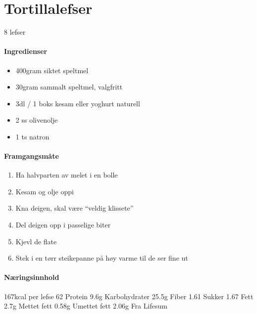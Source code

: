 \section{﻿Tortillalefser}
8 lefser

\paragraph{Ingredienser}
\begin{itemize}[noitemsep]
	\item 400gram siktet speltmel
	\item 30gram sammalt speltmel, valgfritt
	\item 3dl / 1 boks kesam eller yoghurt naturell
	\item 2 ss olivenolje
	\item 1 ts natron
\end{itemize}

\paragraph{Framgangsmåte}
\begin{enumerate}[noitemsep]
	\item Ha halvparten av melet i en bolle
	\item Kesam og olje oppi
	\item Kna deigen, skal være “veldig klissete”
	\item Del deigen opp i passelige biter
	\item Kjevl de flate
	\item Stek i en tørr steikepanne på høy varme til de ser fine ut
\end{enumerate}

\paragraph{Næringsinnhold}
167kcal per lefse
62%
Protein 9.6g
Karbohydrater 25.5g
	Fiber 1.61
	Sukker 1.67
Fett 2.7g
	Mettet fett 0.58g
	Umettet fett 2.06g
Fra Lifesum
